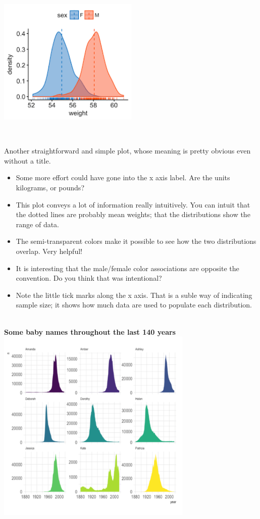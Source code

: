 \documentclass[
]{book}
\providecommand{\tightlist}{%
  \setlength{\itemsep}{0pt}\setlength{\parskip}{0pt}}
\begin{document}
~\\

\includegraphics[width=0.5\textwidth,height=\textheight]{img/visf.png}

~

Another straightforward and simple plot, whose meaning is pretty obvious even without a title.

\begin{itemize}
\tightlist
\item
  Some more effort could have gone into the x axis label. Are the units kilograms, or pounds?
\item
  This plot conveys a lot of information really intuitively. You can intuit that the dotted lines are probably mean weights; that the distributions show the range of data.\\
\item
  The semi-transparent colors make it possible to see how the two distributions overlap. Very helpful!
\item
  It is interesting that the male/female color associations are opposite the convention. Do you think that was intentional?\\
\item
  Note the little tick marks along the x axis. That is a suble way of indicating sample size; it shows how much data are used to populate each distribution.
\end{itemize}

~\\

\textbf{Some baby names throughout the last 140 years}
\includegraphics[width=0.7\textwidth,height=\textheight]{img/visg.png}
\end{document}
